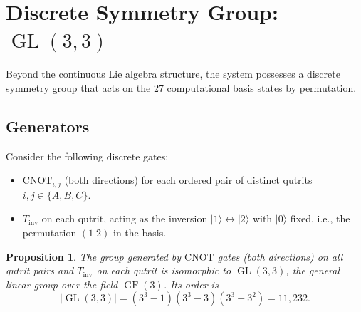 \documentclass[12pt,a4paper]{article}
\newtheorem{proposition}[theorem]{Proposition}
\newcommand{\GL}{\operatorname{GL}}
\newcommand{\GF}{\operatorname{GF}}
\begin{document}
\section{Discrete Symmetry Group: $\GL(3,3)$}

\label{sec:gl33}

Beyond the continuous Lie algebra structure, the system possesses a
discrete symmetry group that acts on the 27 computational basis states
by permutation.

\subsection{Generators}

Consider the following discrete gates:
\begin{itemize}
\item $\text{CNOT}_{i,j}$ (both directions) for each ordered pair of
distinct qutrits $i,j \in \{A,B,C\}$.
\item $T_{\text{inv}}$ on each qutrit, acting as the inversion
$|1\rangle \leftrightarrow |2\rangle$ with $|0\rangle$ fixed,
i.e., the permutation $(1\;2)$ in the basis.
\end{itemize}

\begin{proposition}
\label{prop:gl33}
The group generated by $\text{CNOT}$ gates (both directions) on all qutrit
pairs and $T_{\text{inv}}$ on each qutrit is isomorphic to
$\GL(3,3)$, the general linear group over the field $\GF(3)$. Its order
is
\[
|\GL(3,3)| = (3^3-1)(3^3-3)(3^3-3^2) = 11{,}232.
\]
\end{proposition}
\end{document}
